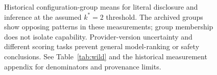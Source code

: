 \begin{figure}[t]
{}
\caption{Historical configuration-group means for literal disclosure and
inference at the assumed $k^{*}=2$ threshold. The archived groups show opposing
patterns in these measurements; group membership does not isolate capability.
Provider-version uncertainty and different scoring tasks prevent general
model-ranking or safety conclusions. See Table~\ref{tab:wild} and the historical
measurement appendix for denominators and provenance limits.}
\label{fig:trends}
\end{figure}
